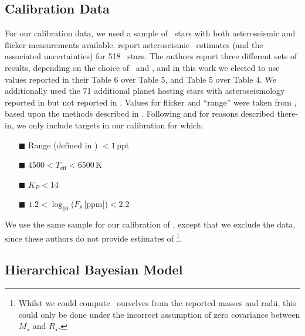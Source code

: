 
\subsection{Calibration Data}

For our calibration data, we used a sample of \Kepler\ stars with
both asteroseismic and flicker measurements available. \citet{chaplin:2014}
report asteroseismic \rhostar\ estimates (and the associated uncertainties) for
518 \Kepler\ stars. The authors report three different sets of results, 
depending on the choice of \Teff\ and \FeH, and in this work we elected to use 
values reported in their Table 6 over Table 5, and Table 5 over Table 4. We
additionally used the 71 additional planet hosting stars with asteroseismology
reported in \citet{huber:2013} but not reported in \citet{chaplin:2014}. Values
for flicker and ``range'' were taken from \citet{kipping:2014}, based upon the
methods described in \citet{bastien:2013}. Following \citet{kipping:2014} and
for reasons described there-in, we only include targets in our calibration for
which:

\begin{itemize}
\item[{\tiny$\blacksquare$}] Range (defined in \citealt{bastien:2013})
$<1$\,ppt
\item[{\tiny$\blacksquare$}] $4500<T_{\mathrm{eff}}<6500$\,K
\item[{\tiny$\blacksquare$}] $K_P<14$
\item[{\tiny$\blacksquare$}] $1.2 < \log_{10}$($F_8$\,[ppm])$< 2.2$
\end{itemize}

We use the same sample for our calibration of \logg, except that we exclude the
\citet{huber:2013} data, since these authors do not provide estimates of
\logg\footnote{Whilst we could compute \logg\ ourselves from the reported
masses and radii, this could only be done under the incorrect assumption of
zero covariance between $M_{\star}$ and $R_{\star}$.}.

\subsection{Hierarchical Bayesian Model}

